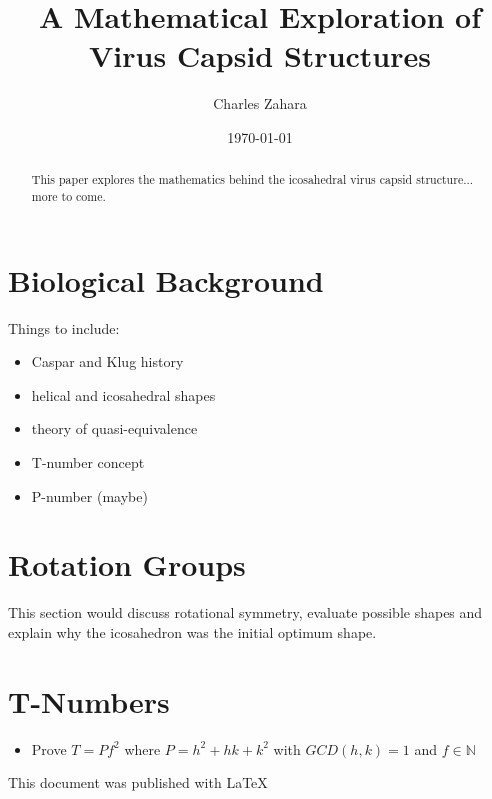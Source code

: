 \documentclass[a4paper]{article}
\title{A Mathematical Exploration of Virus Capsid Structures}
\author{Charles Zahara}
\date{\today}
\begin{document}
\maketitle

\begin{abstract}
This paper explores the mathematics behind the icosahedral virus capsid structure... more to come.
\end{abstract}

\section{Biological Background}

Things to include:
\begin{itemize}
\item Caspar and Klug history
\item helical and icosahedral shapes
\item theory of quasi-equivalence
\item T-number concept
\item P-number (maybe)
\end{itemize}

\section{Rotation Groups}
This section would discuss rotational symmetry, evaluate possible shapes and explain why the icosahedron was the initial optimum shape. 

\section{T-Numbers}

\begin{itemize}
\item Prove $T = P f^2$ where $P = h^2 + h k + k^2$ with $GCD(h,k) = 1$ and $f \in \mathbb{N} $ 
\end{itemize}

This document was published with \LaTeX{}
\end{document}
